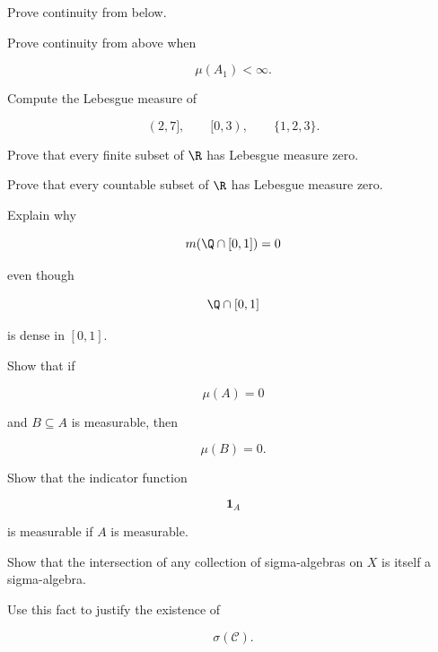 \begin{exercise}[2]
Prove continuity from below.
\end{exercise}

\begin{exercise}[2]
Prove continuity from above when

\[
\mu(A_1)<\infty.
\]
\end{exercise}

\begin{exercise}[2]
Compute the Lebesgue measure of

\[
(2,7],
\qquad
[0,3),
\qquad
\{1,2,3\}.
\]
\end{exercise}

\begin{exercise}[2]
Prove that every finite subset of \(\R\) has Lebesgue measure zero.
\end{exercise}

\begin{exercise}[2]
Prove that every countable subset of \(\R\) has Lebesgue measure zero.
\end{exercise}

\begin{exercise}[2]
Explain why

\[
m(\Q\cap[0,1])=0
\]

even though

\[
\Q\cap[0,1]
\]

is dense in \([0,1]\).
\end{exercise}

\begin{exercise}[2]
Show that if

\[
\mu(A)=0
\]

and \(B\subseteq A\) is measurable, then

\[
\mu(B)=0.
\]
\end{exercise}

\begin{exercise}[2]
Show that the indicator function

\[
\mathbf{1}_A
\]

is measurable if \(A\) is measurable.
\end{exercise}

\begin{exercise}[3]
Show that the intersection of any collection of sigma-algebras on \(X\)
is itself a sigma-algebra.
\end{exercise}

\begin{exercise}[3]
Use this fact to justify the existence of

\[
\sigma(\mathcal{C}).
\]
\end{exercise}

